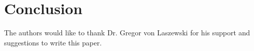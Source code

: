 \documentclass[sigconf]{acmart}
\begin{document}
\section{Conclusion}




\begin{acks}

  The authors would like to thank Dr. Gregor von Laszewski for his support and suggestions to write this paper.

\end{acks}


 
\end{document}
